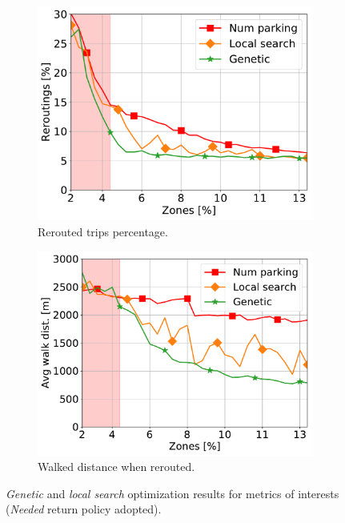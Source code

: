 \begin{figure}[t!]
\begin{center}
\begin{subfigure}{0.49\textwidth}
			\includegraphics[width=\columnwidth]{figures/Needed_ReroutePerc.pdf}
			\caption{Rerouted trips percentage.}
			\label{fig:7_7a_reroute_Needed}
		\end{subfigure}
		\begin{subfigure}{0.49\textwidth}
			\includegraphics[width=\columnwidth]{figures/Needed_AvgWalkedDistance.pdf}
			\caption{Walked distance when rerouted.}
			\label{fig:7_7a_awd_Needed}
		\end{subfigure}         
		\caption{\textit{Genetic} and \textit{local search} optimization results for metrics of interests (\textit{Needed} return policy adopted).}
		\label{fig:7_7a_opt_needed}
	\end{center}
\end{figure}

